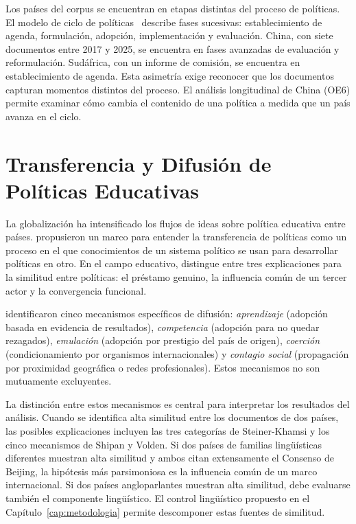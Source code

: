 Los países del corpus se encuentran en etapas distintas del proceso de políticas. El modelo de ciclo de políticas~\citep{lasswell1951policy,howlett2003studying} describe fases sucesivas: establecimiento de agenda, formulación, adopción, implementación y evaluación. China, con siete documentos entre 2017 y 2025, se encuentra en fases avanzadas de evaluación y reformulación. Sudáfrica, con un informe de comisión, se encuentra en establecimiento de agenda. Esta asimetría exige reconocer que los documentos capturan momentos distintos del proceso. El análisis longitudinal de China (OE6) permite examinar cómo cambia el contenido de una política a medida que un país avanza en el ciclo.


\section{Transferencia y Difusión de Políticas Educativas}
\label{sec:difusion}

La globalización ha intensificado los flujos de ideas sobre política educativa entre países. \citet{dolowitz2000learning} propusieron un marco para entender la transferencia de políticas como un proceso en el que conocimientos de un sistema político se usan para desarrollar políticas en otro. En el campo educativo, \citet{steinerkhamsi2014cross} distingue entre tres explicaciones para la similitud entre políticas: el préstamo genuino, la influencia común de un tercer actor y la convergencia funcional.

\citet{shipan2012diffusion} identificaron cinco mecanismos específicos de difusión: \textit{aprendizaje} (adopción basada en evidencia de resultados), \textit{competencia} (adopción para no quedar rezagados), \textit{emulación} (adopción por prestigio del país de origen), \textit{coerción} (condicionamiento por organismos internacionales) y \textit{contagio social} (propagación por proximidad geográfica o redes profesionales). Estos mecanismos no son mutuamente excluyentes.

La distinción entre estos mecanismos es central para interpretar los resultados del análisis. Cuando se identifica alta similitud entre los documentos de dos países, las posibles explicaciones incluyen las tres categorías de Steiner-Khamsi y los cinco mecanismos de Shipan y Volden. Si dos países de familias lingüísticas diferentes muestran alta similitud y ambos citan extensamente el Consenso de Beijing, la hipótesis más parsimoniosa es la influencia común de un marco internacional. Si dos países angloparlantes muestran alta similitud, debe evaluarse también el componente lingüístico. El control lingüístico propuesto en el Capítulo~\ref{cap:metodologia} permite descomponer estas fuentes de similitud.


